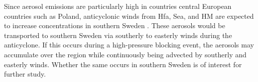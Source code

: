 Since aerosol emissions are particularly high in countries central European countries such as Poland, anticyclonic winds from Hfa, Sea, and HM are expected to increase \PM  concentrations in southern Sweden \cite{europeanenvironmentagencyEuropesAirQuality2024}. These aerosols would be transported to southern Sweden via southerly to easterly winds during the anticyclone. If this occurs during a high-pressure blocking event, the aerosols may accumulate over the region while continuously being advected by southerly and easterly winds. Whether the same occurs in southern Sweden is of interest for further study.